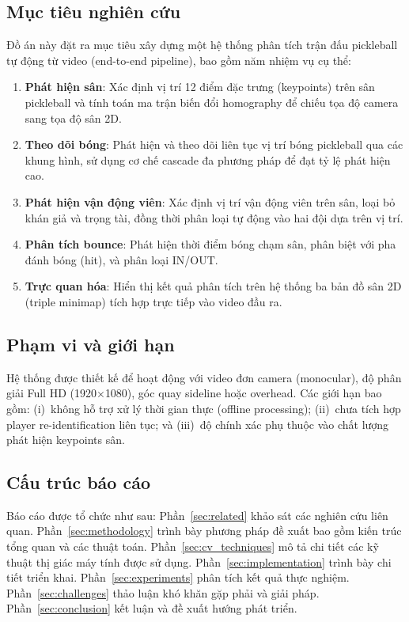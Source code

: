 \documentclass[12pt,a4paper]{article}
\begin{document}
\subsection{Mục tiêu nghiên cứu}

Đồ án này đặt ra mục tiêu xây dựng một hệ thống phân tích trận đấu pickleball tự động từ video (end-to-end pipeline), bao gồm năm nhiệm vụ cụ thể:

\begin{enumerate}
    \item \textbf{Phát hiện sân}: Xác định vị trí 12 điểm đặc trưng (keypoints) trên sân pickleball và tính toán ma trận biến đổi homography để chiếu tọa độ camera sang tọa độ sân 2D.
    \item \textbf{Theo dõi bóng}: Phát hiện và theo dõi liên tục vị trí bóng pickleball qua các khung hình, sử dụng cơ chế cascade đa phương pháp để đạt tỷ lệ phát hiện cao.
    \item \textbf{Phát hiện vận động viên}: Xác định vị trí vận động viên trên sân, loại bỏ khán giả và trọng tài, đồng thời phân loại tự động vào hai đội dựa trên vị trí.
    \item \textbf{Phân tích bounce}: Phát hiện thời điểm bóng chạm sân, phân biệt với pha đánh bóng (hit), và phân loại IN/OUT.
    \item \textbf{Trực quan hóa}: Hiển thị kết quả phân tích trên hệ thống ba bản đồ sân 2D (triple minimap) tích hợp trực tiếp vào video đầu ra.
\end{enumerate}

\subsection{Phạm vi và giới hạn}

Hệ thống được thiết kế để hoạt động với video đơn camera (monocular), độ phân giải Full HD (1920$\times$1080), góc quay sideline hoặc overhead. Các giới hạn bao gồm: (i)~không hỗ trợ xử lý thời gian thực (offline processing); (ii)~chưa tích hợp player re-identification liên tục; và (iii)~độ chính xác phụ thuộc vào chất lượng phát hiện keypoints sân.

\subsection{Cấu trúc báo cáo}

Báo cáo được tổ chức như sau: Phần~\ref{sec:related} khảo sát các nghiên cứu liên quan. Phần~\ref{sec:methodology} trình bày phương pháp đề xuất bao gồm kiến trúc tổng quan và các thuật toán. Phần~\ref{sec:cv_techniques} mô tả chi tiết các kỹ thuật thị giác máy tính được sử dụng. Phần~\ref{sec:implementation} trình bày chi tiết triển khai. Phần~\ref{sec:experiments} phân tích kết quả thực nghiệm. Phần~\ref{sec:challenges} thảo luận khó khăn gặp phải và giải pháp. Phần~\ref{sec:conclusion} kết luận và đề xuất hướng phát triển.
\end{document}

